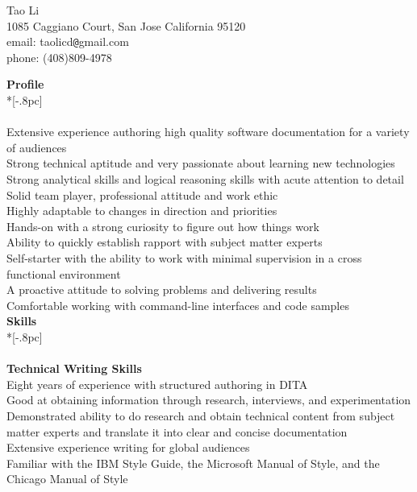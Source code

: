 \documentclass[11pt]{extarticle}
\begin{document}
\begin{center}
{\Large Tao Li} \\[0.2pc]
1085 Caggiano Court, San Jose California  95120 \\
email: taolicd\verb|@|gmail.com \\
 phone: (408)809-4978     \\

\end{center}

{\large \bf Profile} \\*[-.8pc]
\underline{\hspace{6.55in}} \\
\\
Extensive experience authoring high quality software documentation for a variety of audiences  \\
Strong technical aptitude and very passionate about learning new technologies\\
Strong analytical skills and logical reasoning skills with acute attention to detail\\
Solid team player, professional attitude and work ethic\\
Highly adaptable to changes in direction and priorities\\
Hands-on with a strong curiosity  to figure out how things work\\
Ability to quickly establish rapport with subject matter experts\\
Self-starter with the ability to work with minimal supervision in a cross functional environment\\
A proactive attitude to solving problems and delivering results\\
Comfortable working with command-line interfaces and code samples\\



{\large \bf Skills} \\*[-.8pc]
\underline{\hspace{6.55in}} \\
\\
{\bf Technical Writing Skills} \\
Eight years of experience with structured authoring in DITA\\
Good at obtaining information through research, interviews, and experimentation\\
Demonstrated ability to do research and obtain technical content from subject matter experts and translate it into clear and concise documentation\\
 Extensive experience writing for global audiences\\
 Familiar with the IBM Style Guide, the Microsoft Manual of Style, and the Chicago Manual of Style\\
\end{document}
